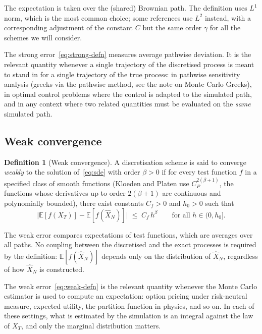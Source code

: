 \documentclass[11pt,a4paper]{article}
\theoremstyle{plain}
\theoremstyle{definition}
\newtheorem{definition}[theorem]{Definition}
\theoremstyle{remark}
\newcommand{\E}{\mathbb{E}}
\begin{document}
The expectation is taken over the (shared) Brownian path. The
definition uses $L^1$ norm, which is the most common choice; some
references use $L^2$ instead, with a corresponding adjustment of the
constant $C$ but the same order $\gamma$ for all the schemes we will
consider.

The strong error~\eqref{eq:strong-defn} measures average pathwise
deviation. It is the relevant quantity whenever a single trajectory of
the discretised process is meant to stand in for a single trajectory
of the true process: in pathwise sensitivity analysis (greeks via the
pathwise method, see the note on Monte Carlo Greeks), in optimal control
problems where the
control is adapted to the simulated path, and in any context where
two related quantities must be evaluated on the \emph{same} simulated
path.

\subsection{Weak convergence}

\begin{definition}[Weak convergence]
\label{def:weak}
A discretisation scheme is said to converge \emph{weakly} to the
solution of~\eqref{eq:sde} with order $\beta > 0$ if for every test
function $f$ in a specified class of smooth functions (Kloeden and
Platen use $C_P^{2(\beta+1)}$, the functions whose derivatives up to
order $2(\beta+1)$ are continuous and polynomially bounded), there exist
constants $C_f > 0$ and $h_0 > 0$ such that
\begin{equation}
\label{eq:weak-defn}
\big| \E[f(X_T)] - \E[f(\hat X_N)] \big|
\;\leq\; C_f\, h^\beta
\qquad \text{for all } h \in (0, h_0].
\end{equation}
\end{definition}

The weak error compares expectations of test functions, which are
averages over all paths. No coupling between the discretised and the
exact processes is required by the definition: $\E[f(\hat X_N)]$
depends only on the distribution of $\hat X_N$, regardless of how
$\hat X_N$ is constructed.

The weak error~\eqref{eq:weak-defn} is the relevant quantity whenever
the Monte Carlo estimator is used to compute an expectation: option
pricing under risk-neutral measure, expected utility, the partition
function in physics, and so on. In each of these settings, what is
estimated by the simulation is an integral against the law of $X_T$,
and only the marginal distribution matters.
\end{document}
